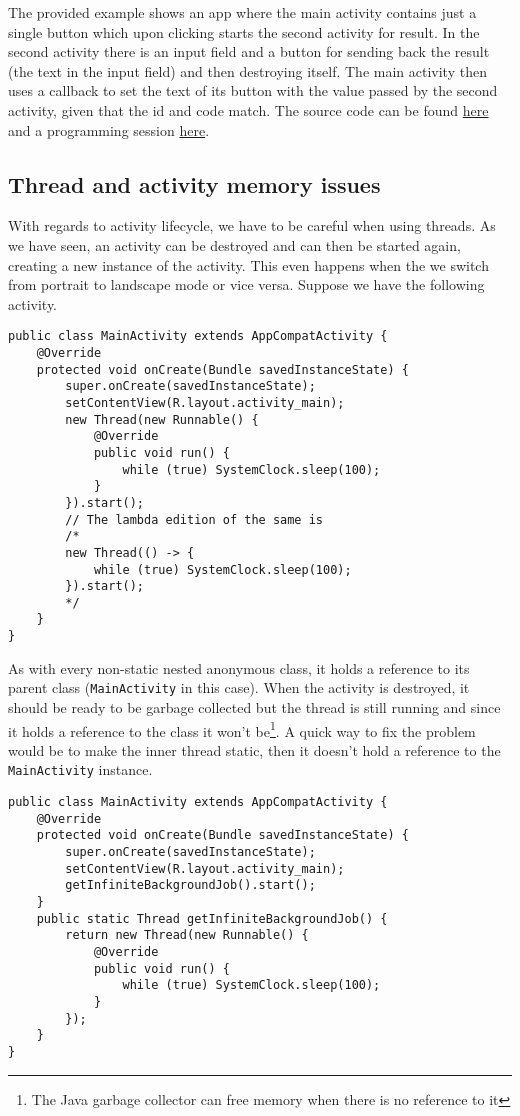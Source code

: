 The provided example shows an app where the main activity contains just a single button which upon clicking starts the second activity for result. In the second activity there is an input field and a button for sending back the result (the text in the input field) and then destroying itself. The main activity then uses a callback to set the text of its button with the value passed by the second activity, given that the id and code match. The source code can be found \href{https://github.com/JonSteinn/AndroidDevelopment/tree/master/examples/lab3/activityforresult}{here} and a programming session \href{TODO}{here}.

\subsection{Thread and activity memory issues}
With regards to activity lifecycle, we have to be careful when using threads. As we have seen, an activity can be destroyed and can then be started again, creating a new instance of the activity. This even happens when the we switch from portrait to landscape mode or vice versa. Suppose we have the following activity.
\begin{lstlisting}[style=A_Java]
public class MainActivity extends AppCompatActivity {
    @Override
    protected void onCreate(Bundle savedInstanceState) {
        super.onCreate(savedInstanceState);
        setContentView(R.layout.activity_main);
        new Thread(new Runnable() {
            @Override
            public void run() {
                while (true) SystemClock.sleep(100);
            }
        }).start();
        // The lambda edition of the same is
        /*
        new Thread(() -> {
            while (true) SystemClock.sleep(100);
        }).start();
        */
    }
}
\end{lstlisting}
As with every non-static nested anonymous class, it holds a reference to its parent class (\texttt{MainActivity} in this case). When the activity is destroyed, it should be ready to be garbage collected but the thread is still running and since it holds a reference to the class it won't be\footnote{The Java garbage collector can free memory when there is no reference to it}. A quick way to fix the problem would be to make the inner thread static, then it doesn't hold a reference to the \texttt{MainActivity} instance.
\begin{lstlisting}[style=A_Java]
public class MainActivity extends AppCompatActivity {
    @Override
    protected void onCreate(Bundle savedInstanceState) {
        super.onCreate(savedInstanceState);
        setContentView(R.layout.activity_main);
        getInfiniteBackgroundJob().start();
    }
    public static Thread getInfiniteBackgroundJob() {
        return new Thread(new Runnable() {
            @Override
            public void run() {
                while (true) SystemClock.sleep(100);
            }
        });
    }
}
\end{lstlisting}
